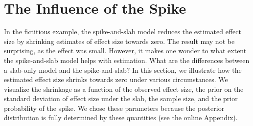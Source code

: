 \documentclass[a4paper]{article}
\newenvironment{revision}{\color{black}}{\color{black}}
\begin{document}
\begin{revision}%
\section*{The Influence of the Spike}

In the fictitious example, the spike-and-slab model reduces the estimated effect size by shrinking estimates of effect size towards zero.
The result may not be surprising, as the effect was small.
However, it makes one wonder to what extent the spike-and-slab model helps with estimation.
What are the differences between a slab-only model and the spike-and-slab?
In this section, we illustrate how the estimated effect size shrinks towards zero under various circumstances. 
We visualize the shrinkage as a function of the observed effect size, the prior on the standard deviation of effect size under the slab, the sample size, and the prior probability of the spike.
We chose these parameters because the posterior distribution is fully determined by these quantities (see the online Appendix).


\end{revision}
\end{document}
